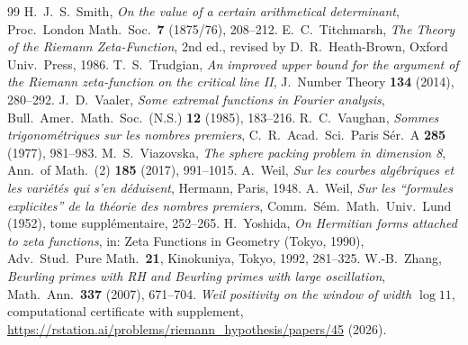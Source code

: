\documentclass[11pt]{amsart}
\theoremstyle{definition}
\theoremstyle{remark}
\numberwithin{equation}{section}
\begin{document}
\begin{thebibliography}{99}
 H.~J.~S.~Smith, \emph{On the value of a certain arithmetical determinant}, Proc.\ London Math.\ Soc.\ \textbf{7} (1875/76), 208--212.
 E.~C.~Titchmarsh, \emph{The Theory of the Riemann Zeta-Function}, 2nd ed., revised by D.~R.~Heath-Brown, Oxford Univ.\ Press, 1986.
 T.~S.~Trudgian, \emph{An improved upper bound for the argument of the Riemann zeta-function on the critical line II}, J.\ Number Theory \textbf{134} (2014), 280--292.
 J.~D.~Vaaler, \emph{Some extremal functions in Fourier analysis}, Bull.\ Amer.\ Math.\ Soc.\ (N.S.) \textbf{12} (1985), 183--216.
 R.~C.~Vaughan, \emph{Sommes trigonom\'etriques sur les nombres premiers}, C.~R.\ Acad.\ Sci.\ Paris S\'er.~A \textbf{285} (1977), 981--983.
 M.~S.~Viazovska, \emph{The sphere packing problem in dimension 8}, Ann.\ of Math.\ (2) \textbf{185} (2017), 991--1015.
 A.~Weil, \emph{Sur les courbes alg\'ebriques et les vari\'et\'es qui s'en d\'eduisent}, Hermann, Paris, 1948.
 A.~Weil, \emph{Sur les ``formules explicites'' de la th\'eorie des nombres premiers}, Comm.\ S\'em.\ Math.\ Univ.\ Lund (1952), tome suppl\'ementaire, 252--265.
 H.~Yoshida, \emph{On Hermitian forms attached to zeta functions}, in: Zeta Functions in Geometry (Tokyo, 1990), Adv.\ Stud.\ Pure Math.\ \textbf{21}, Kinokuniya, Tokyo, 1992, 281--325.
 W.-B.~Zhang, \emph{Beurling primes with RH and Beurling primes with large oscillation}, Math.\ Ann.\ \textbf{337} (2007), 671--704.
 \emph{Weil positivity on the window of width $\log 11$}, computational certificate with supplement,
\url{https://rstation.ai/problems/riemann_hypothesis/papers/45} (2026).


\end{thebibliography}
\end{document}
